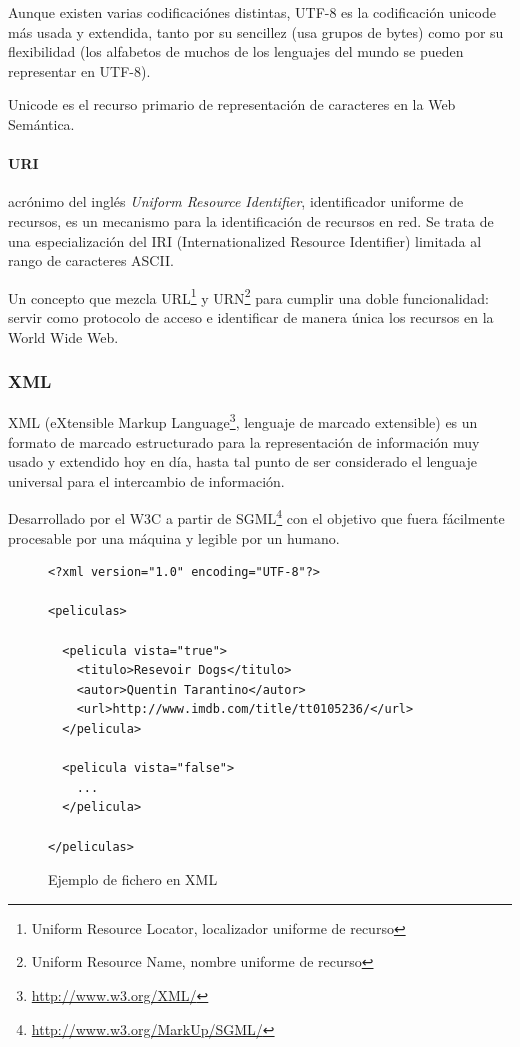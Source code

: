 Aunque existen varias codificaciónes distintas, UTF-8\cite{Yergeau2003} es la 
codificación unicode más usada y extendida, tanto por su sencillez (usa grupos 
de bytes) como por su flexibilidad (los alfabetos de muchos de los lenguajes 
del mundo se pueden representar en UTF-8).

Unicode es el recurso primario de representación de caracteres en la Web Semántica.

\paragraph{URI}acrónimo del inglés \emph{Uniform Resource Identifier}\cite{Berners-Lee1998}, 
identificador uniforme de recursos, es un mecanismo para la identificación de recursos
en red. Se trata de una especialización del IRI (Internationalized Resource Identifier) 
limitada al rango de caracteres ASCII.

Un concepto que mezcla URL\footnote{Uniform Resource Locator, localizador uniforme de recurso} 
y URN\footnote{Uniform Resource Name, nombre uniforme de recurso} para cumplir una doble 
funcionalidad: servir como protocolo de acceso e identificar de manera única los recursos 
en la World Wide Web.

\subsubsection{XML}

XML\cite{Bray2006} (eXtensible Markup Language\footnote{\url{http://www.w3.org/XML/}}, 
lenguaje  de marcado extensible) es un formato de marcado estructurado para la 
representación de información muy usado y extendido hoy en día, hasta tal punto de 
ser considerado el lenguaje universal para el intercambio de información. 

Desarrollado por el W3C a partir de SGML\footnote{\url{http://www.w3.org/MarkUp/SGML/}} 
con el objetivo que fuera fácilmente procesable por una máquina y legible por un 
humano. 

\begin{figure}[H]
\lstset{language=PeliculasXML}
\begin{lstlisting}
<?xml version="1.0" encoding="UTF-8"?>

<peliculas>

  <pelicula vista="true">
    <titulo>Resevoir Dogs</titulo>
    <autor>Quentin Tarantino</autor>
    <url>http://www.imdb.com/title/tt0105236/</url>
  </pelicula>

  <pelicula vista="false">
    ...
  </pelicula>

</peliculas>
\end{lstlisting}
\caption{Ejemplo de fichero en XML}
\label{fig:ejemplo.xml}
\end{figure}

